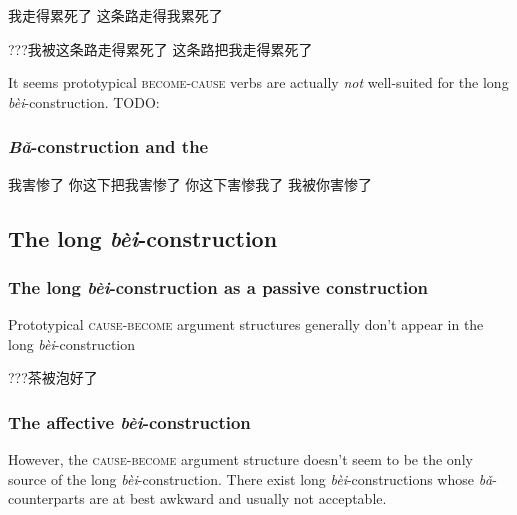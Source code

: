 \documentclass[UTF8, a4paper, oneside, scheme=plain]{ctexrep}
\newcommand*{\citepages}[1]{pp.~{#1}}
\newcommand{\corpus}[1]{\emph{#1}}
\newcommand*{\category}[1]{\textsc{#1}}
\begin{document}
\begin{exe}
    \ex\label{ex:verb-phrase.ba.cause.2} \begin{xlist}
        \ex 我走得累死了
        \ex 这条路走得我累死了
    \end{xlist}
    \ex\label{ex:verb-phrase.ba.bei-2} ???我被这条路走得累死了
    \ex\label{ex:verb-phrase.ba.ba-2} 这条路把我走得累死了
\end{exe}

It seems prototypical \category{become}-\category{cause} verbs 
are actually \emph{not} well-suited for the long \corpus{bèi}-construction.
TODO: \cite[\citepages{98-99}]{deng2010formal}

\subsubsection{\corpus{Bǎ}-construction and the }

\begin{exe}
    \ex *我害惨了
    \ex 你这下把我害惨了
    \ex 你这下害惨我了
    \ex 我被你害惨了
\end{exe}

\subsection{The long \corpus{bèi}-construction}

\subsubsection{The long \corpus{bèi}-construction as a passive construction}


Prototypical \category{cause}-\category{become} argument structures 
generally don't appear in the long \corpus{bèi}-construction

\begin{exe}
    \ex ???茶被泡好了
\end{exe}

\subsubsection{The affective \corpus{bèi}-construction}

However, the \category{cause}-\category{become} argument structure
doesn't seem to be the only source of the long \corpus{bèi}-construction.
There exist long \corpus{bèi}-constructions whose \corpus{bǎ}-counterparts 
are at best awkward and usually not acceptable.
\end{document}
